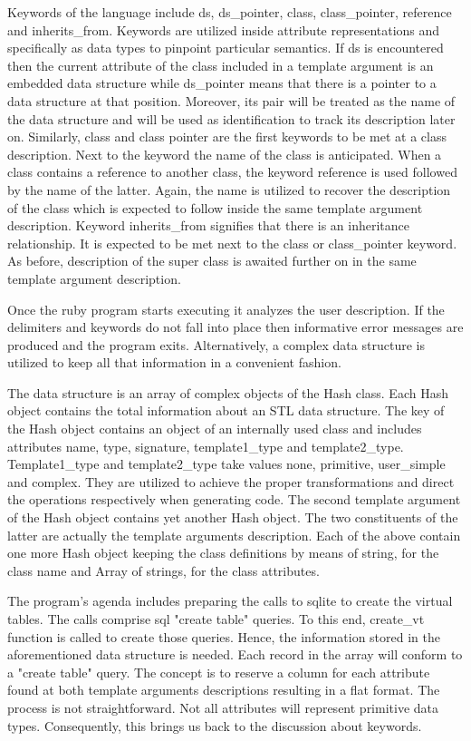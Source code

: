 \documentclass[pdftex, 11pt, a4paper]{report}
\begin{document}
\par
Keywords of the language include ds, ds\_pointer, class, class\_pointer, reference and inherits\_from. Keywords are utilized inside attribute representations and specifically as data types to pinpoint particular semantics. If ds is encountered then the current attribute of the class included in a template argument is an embedded data structure while ds\_pointer means that there is a pointer to a data structure at that position. Moreover, its pair will be treated as the name of the data structure and will be used as identification to track its description later on. Similarly, class and class pointer are the first keywords to be met at a class description. Next to the keyword the name of the class is anticipated. When a class contains a reference to another class, the keyword reference is used followed by the name of the latter. Again, the name is utilized to recover the description of the class which is expected to follow inside the same template argument description. Keyword inherits\_from signifies that there is an inheritance relationship. It is expected to be met next to the class or class\_pointer keyword. As before, description of the super class is awaited further on in the same template argument description.
\par
Once the ruby program starts executing it analyzes the user description. If the delimiters and keywords do not fall into place then informative error messages are produced and the program exits. Alternatively, a complex data structure is utilized to keep all that information in a convenient fashion. 
\par
The data structure is an array of complex objects of the Hash class. Each Hash object contains the total information about an STL data structure. The key of the Hash object contains an object of an internally used class and includes attributes name, type, signature, template1\_type and template2\_type. Template1\_type and template2\_type take values none, primitive, user\_simple and complex. They are utilized to achieve the proper transformations and direct the operations respectively when generating code. The second template argument of the Hash object contains yet another Hash object. The two constituents of the latter are actually the template arguments description. Each of the above contain one more Hash object keeping the class definitions by means of string, for the class name and Array of strings, for the class attributes.
\par
The program's agenda includes preparing the calls to sqlite to create the virtual tables. The calls comprise sql "create table" queries. To this end, create\_vt function is called to create those queries. Hence, the information stored in the aforementioned data structure is needed. Each record in the array will conform to a "create table" query. The concept is to reserve a column for each attribute found at both template arguments descriptions resulting in a flat format. The process is not straightforward. Not all attributes will represent primitive data types. Consequently, this brings us back to the discussion about keywords.
\end{document}
